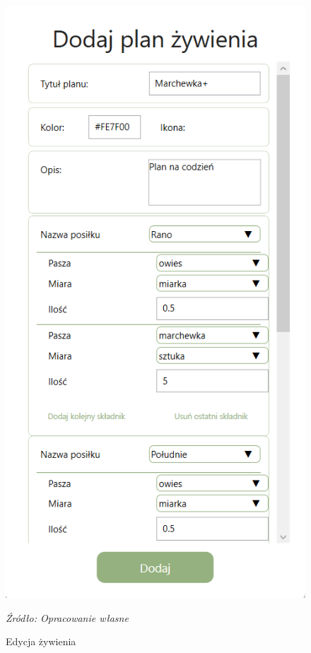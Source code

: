 \documentclass[12pt,oneside]{report}
\begin{document}
\begin{figure} [H]
\begin{center}
		\hfil
		\begin{minipage}{6cm}
			\centering
			\includegraphics[scale=0.7]{edytujZywienie}
			\caption{Edycja żywienia}
			\textit{Źródło: Opracowanie własne}
			\label{EdytujZywienie}
		\end{minipage}
	\end{center}
\end{figure}
\end{document}
